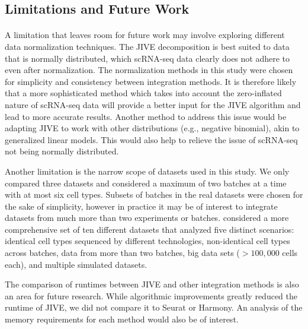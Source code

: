 \documentclass[
12pt, %
letterpaper, %
oneside, %
headinclude,footinclude, %
BCOR5mm, %
]{scrartcl}
\begin{document}
\subsection{Limitations and Future Work}

\paragraph*{}
A limitation that leaves room for future work may involve exploring different data normalization techniques. The JIVE decomposition is best suited to data that is normally distributed, which scRNA-seq data clearly does not adhere to even after normalization. The normalization methods in this study were chosen for simplicity and consistency between integration methods. It is therefore likely that a more sophisticated method which takes into account the zero-inflated nature of scRNA-seq data will provide a better input for the JIVE algorithm and lead to more accurate results. Another method to address this issue would be adapting JIVE to work with other distributions (e.g., negative binomial), akin to generalized linear models. This would also help to relieve the issue of scRNA-seq not being normally distributed.

Another limitation is the narrow scope of datasets used in this study. We only compared three datasets and considered a maximum of two batches at a time with at most six cell types. Subsets of batches in the real datasets were chosen for the sake of simplicity, however in practice it may be of interest to integrate datasets from much more than two experiments or batches. \citet{tran2020benchmark} considered a more comprehensive set of ten different datasets that analyzed five distinct scenarios: identical cell types sequenced by different technologies, non-identical cell types across batches, data from more than two batches, big data sets ($>100,000$ cells each), and multiple simulated datasets. 

The comparison of runtimes between JIVE and other integration methods is also an area for future research. While algorithmic improvements greatly reduced the runtime of JIVE, we did not compare it to Seurat or Harmony. An analysis of the memory requirements for each method would also be of interest.


\renewcommand{\refname}{\spacedlowsmallcaps{References}} %


% 

\end{document}
